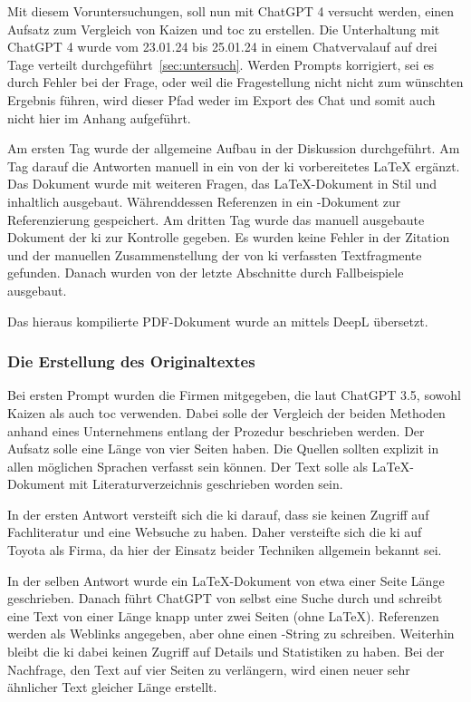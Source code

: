 Mit diesem Voruntersuchungen, soll nun mit ChatGPT 4 versucht werden, einen Aufsatz zum Vergleich von Kaizen und \gls{toc} zu erstellen. Die Unterhaltung mit ChatGPT 4 wurde vom 23.01.24 bis 25.01.24 in einem Chatvervalauf auf drei Tage verteilt durchgeführt~\ref{sec:untersuch}. Werden Prompts korrigiert, sei es durch Fehler bei der Frage, oder weil die Fragestellung nicht nicht zum wünschten Ergebnis führen, wird dieser Pfad weder im Export des Chat und somit auch nicht hier im Anhang aufgeführt.

Am ersten Tag wurde der allgemeine Aufbau in der Diskussion durchgeführt. Am Tag darauf die Antworten manuell in ein von der \gls{ki} vorbereitetes \LaTeX{} ergänzt. Das Dokument wurde mit weiteren Fragen, das \LaTeX{}-Dokument in Stil und inhaltlich ausgebaut. Währenddessen Referenzen in ein \BibTeX{}-Dokument zur Referenzierung gespeichert. Am dritten Tag wurde das manuell ausgebaute Dokument der \gls{ki} zur Kontrolle gegeben. Es wurden keine Fehler in der Zitation und der manuellen Zusammenstellung der von \gls{ki} verfassten Textfragmente gefunden. Danach wurden von der letzte Abschnitte durch Fallbeispiele ausgebaut. 

Das hieraus kompilierte PDF-Dokument wurde an mittels DeepL übersetzt. 


\subsubsection{Die Erstellung des Originaltextes}

Bei ersten Prompt wurden die Firmen mitgegeben, die laut ChatGPT 3.5, sowohl Kaizen als auch \gls{toc} verwenden. Dabei solle der Vergleich der beiden Methoden anhand eines Unternehmens entlang der Prozedur beschrieben werden. Der Aufsatz solle eine Länge von vier Seiten haben. Die Quellen sollten explizit in allen möglichen Sprachen verfasst sein können. Der Text solle als \LaTeX-Dokument mit Literaturverzeichnis geschrieben worden sein.

In der ersten Antwort versteift sich die \gls{ki} darauf, dass sie keinen Zugriff auf Fachliteratur und eine Websuche zu haben. Daher versteifte sich die \gls{ki} auf Toyota als Firma, da hier der Einsatz beider Techniken allgemein bekannt sei.

In der selben Antwort wurde ein \LaTeX{}-Dokument von etwa einer Seite Länge geschrieben.
Danach führt ChatGPT von selbst eine Suche durch und schreibt eine Text von einer Länge knapp unter zwei Seiten (ohne \LaTeX{}). Referenzen werden als Weblinks angegeben, aber ohne einen \BibTeX{}-String zu schreiben.
\BibTeX
Weiterhin bleibt die \gls{ki} dabei keinen Zugriff auf Details und Statistiken zu haben.
Bei der Nachfrage, den Text auf vier Seiten zu verlängern, wird einen neuer sehr ähnlicher Text gleicher Länge erstellt.


